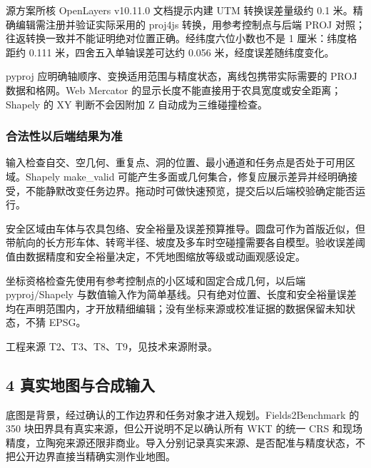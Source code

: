 \documentclass[11pt,a4paper]{article}
\newcommand{\bodytext}[1]{#1\par}
\newcommand{\sourcetext}[1]{{\fontsize{9.2}{14}\selectfont\color{Muted}#1\par}}
\begin{document}
\endgroup
\bodytext{源方案所核 OpenLayers v10.11.0 文档提示内建 UTM 转换误差量级约 0.1 米。精确编辑需注册并验证实际采用的 proj4js 转换，用参考控制点与后端 PROJ 对照；往返转换一致并不能证明绝对位置正确。经纬度六位小数也不是 1 厘米：纬度格距约 0.111 米，四舍五入单轴误差可达约 0.056 米，经度误差随纬度变化。}
\bodytext{pyproj 应明确轴顺序、变换适用范围与精度状态，离线包携带实际需要的 PROJ 数据和格网。Web Mercator 的显示长度不能直接用于农具宽度或安全距离；Shapely 的 XY 判断不会因附加 Z 自动成为三维碰撞检查。}
\subsubsection{合法性以后端结果为准}
\bodytext{输入检查自交、空几何、重复点、洞的位置、最小通道和任务点是否处于可用区域。Shapely make\_\allowbreak{}valid 可能产生多面或几何集合，修复应展示差异并经明确接受，不能静默改变任务边界。拖动时可做快速预览，提交后以后端校验确定能否运行。}
\bodytext{安全区域由车体与农具包络、安全裕量及误差预算推导。圆盘可作为首版近似，但带航向的长方形车体、转弯半径、坡度及多车时空碰撞需要各自模型。验收误差阈值由数据精度和安全裕量决定，不凭地图缩放等级或动画观感设定。}
\bodytext{坐标资格检查先使用有参考控制点的小区域和固定合成几何，以后端 pyproj/\allowbreak{}Shapely 与数值输入作为简单基线。只有绝对位置、长度和安全裕量误差均在声明范围内，才开放精细编辑；没有坐标来源或校准证据的数据保留未知状态，不猜 EPSG。}
\sourcetext{工程来源 T2、T3、T8、T9，见技术来源附录。}
\subsection{4  真实地图与合成输入}
\bodytext{底图是背景，经过确认的工作边界和任务对象才进入规划。Fields2Benchmark 的 350 块田界具有真实来源，但公开说明不足以确认所有 WKT 的统一 CRS 和现场精度，立陶宛来源还限非商业。导入分别记录真实来源、是否配准与精度状态，不把公开边界直接当精确实测作业地图。}
\begingroup
\fontsize{9.6}{14.6}\selectfont
\setlength{\tabcolsep}{4pt}
\renewcommand{\arraystretch}{1.18}
\end{document}
